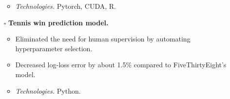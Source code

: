 \documentclass{simplecv}
\begin{document}
\begin{itemize}
\begin{itemize}
    \item {\it Technologies.} Pytorch, CUDA, R.
  \end{itemize}
  \item[$\square$] {\bf Tennis win prediction model.} 
  \begin{itemize}
    \item Eliminated the need for human supervision by automating hyperparameter selection. 
    \item Decreased log-loss error by about 1.5\% compared to FiveThirtyEight's model.
    \item {\it Technologies.} Python.
  \end{itemize}

\end{itemize}
\end{document}
